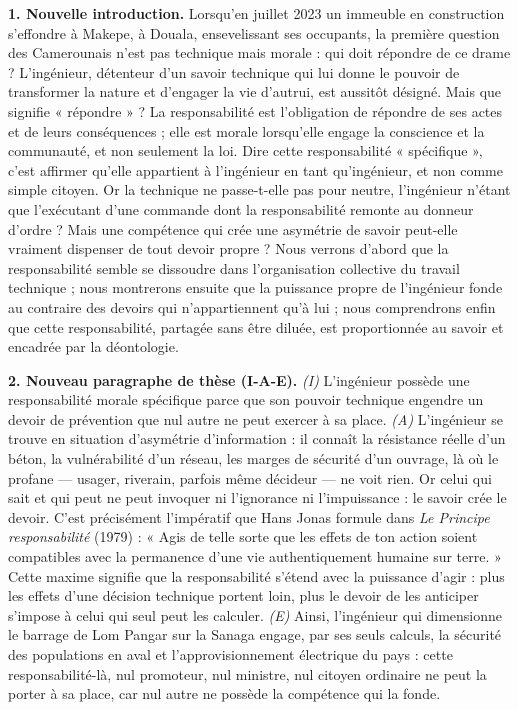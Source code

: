 \documentclass[11pt]{article}
\begin{document}
\begin{corrige}
\textbf{1. Nouvelle introduction.} Lorsqu'en juillet 2023 un immeuble en construction s'effondre à Makepe, à Douala, ensevelissant ses occupants, la première question des Camerounais n'est pas technique mais morale : qui doit répondre de ce drame ? L'ingénieur, détenteur d'un savoir technique qui lui donne le pouvoir de transformer la nature et d'engager la vie d'autrui, est aussitôt désigné. Mais que signifie « répondre » ? La responsabilité est l'obligation de répondre de ses actes et de leurs conséquences ; elle est morale lorsqu'elle engage la conscience et la communauté, et non seulement la loi. Dire cette responsabilité « spécifique », c'est affirmer qu'elle appartient à l'ingénieur en tant qu'ingénieur, et non comme simple citoyen. Or la technique ne passe-t-elle pas pour neutre, l'ingénieur n'étant que l'exécutant d'une commande dont la responsabilité remonte au donneur d'ordre ? Mais une compétence qui crée une asymétrie de savoir peut-elle vraiment dispenser de tout devoir propre ? Nous verrons d'abord que la responsabilité semble se dissoudre dans l'organisation collective du travail technique ; nous montrerons ensuite que la puissance propre de l'ingénieur fonde au contraire des devoirs qui n'appartiennent qu'à lui ; nous comprendrons enfin que cette responsabilité, partagée sans être diluée, est proportionnée au savoir et encadrée par la déontologie.\par
\textbf{2. Nouveau paragraphe de thèse (I-A-E).} \emph{(I)} L'ingénieur possède une responsabilité morale spécifique parce que son pouvoir technique engendre un devoir de prévention que nul autre ne peut exercer à sa place. \emph{(A)} L'ingénieur se trouve en situation d'asymétrie d'information : il connaît la résistance réelle d'un béton, la vulnérabilité d'un réseau, les marges de sécurité d'un ouvrage, là où le profane — usager, riverain, parfois même décideur — ne voit rien. Or celui qui sait et qui peut ne peut invoquer ni l'ignorance ni l'impuissance : le savoir crée le devoir. C'est précisément l'impératif que Hans Jonas formule dans \emph{Le Principe responsabilité} (1979) : « Agis de telle sorte que les effets de ton action soient compatibles avec la permanence d'une vie authentiquement humaine sur terre. » Cette maxime signifie que la responsabilité s'étend avec la puissance d'agir : plus les effets d'une décision technique portent loin, plus le devoir de les anticiper s'impose à celui qui seul peut les calculer. \emph{(E)} Ainsi, l'ingénieur qui dimensionne le barrage de Lom Pangar sur la Sanaga engage, par ses seuls calculs, la sécurité des populations en aval et l'approvisionnement électrique du pays : cette responsabilité-là, nul promoteur, nul ministre, nul citoyen ordinaire ne peut la porter à sa place, car nul autre ne possède la compétence qui la fonde.\par

\end{corrige}
\end{document}
